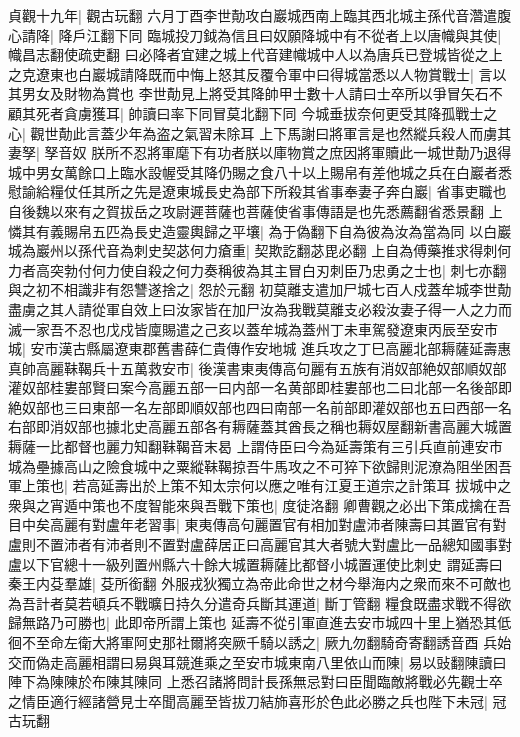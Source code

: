 貞觀十九年|{
	觀古玩翻}
六月丁酉李世勣攻白巖城西南上臨其西北城主孫代音濳遣腹心請降|{
	降戶江翻下同}
臨城投刀鉞為信且曰奴願降城中有不從者上以唐幟與其使|{
	幟昌志翻使疏吏翻}
曰必降者宜建之城上代音建幟城中人以為唐兵已登城皆從之上之克遼東也白巖城請降既而中悔上怒其反覆令軍中曰得城當悉以人物賞戰士|{
	言以其男女及財物為賞也}
李世勣見上將受其降帥甲士數十人請曰士卒所以爭冒矢石不顧其死者貪虜獲耳|{
	帥讀曰率下同冒莫北翻下同}
今城垂拔奈何更受其降孤戰士之心|{
	觀世勣此言蓋少年為盗之氣習未除耳}
上下馬謝曰將軍言是也然縱兵殺人而虜其妻孥|{
	孥音奴}
朕所不忍將軍麾下有功者朕以庫物賞之庶因將軍贖此一城世勣乃退得城中男女萬餘口上臨水設幄受其降仍賜之食八十以上賜帛有差他城之兵在白巖者悉慰諭給糧仗任其所之先是遼東城長史為部下所殺其省事奉妻子奔白巖|{
	省事吏職也自後魏以來有之賀拔岳之攻尉遲菩薩也菩薩使省事傳語是也先悉薦翻省悉景翻}
上憐其有義賜帛五匹為長史造靈輿歸之平壤|{
	為于偽翻下自為彼為汝為當為同}
以白巖城為巖州以孫代音為刺史契苾何力瘡重|{
	契欺訖翻苾毘必翻}
上自為傅藥推求得刺何力者高突勃付何力使自殺之何力奏稱彼為其主冒白刃刺臣乃忠勇之士也|{
	刺七亦翻}
與之初不相識非有怨讐遂捨之|{
	怨於元翻}
初莫離支遣加尸城七百人戍蓋牟城李世勣盡虜之其人請從軍自效上曰汝家皆在加尸汝為我戰莫離支必殺汝妻子得一人之力而滅一家吾不忍也戊戍皆廩賜遣之己亥以蓋牟城為蓋州丁未車駕發遼東丙辰至安市城|{
	安市漢古縣屬遼東郡舊書薛仁貴傳作安地城}
進兵攻之丁巳高麗北部耨薩延壽惠真帥高麗靺鞨兵十五萬救安市|{
	後漢書東夷傳高句麗有五族有消奴部絶奴部順奴部灌奴部桂婁部賢曰案今高麗五部一曰内部一名黄部即桂婁部也二曰北部一名後部即絶奴部也三曰東部一名左部即順奴部也四曰南部一名前部即灌奴部也五曰西部一名右部即消奴部也據北史高麗五部各有耨薩蓋其酋長之稱也耨奴屋翻新書高麗大城置耨薩一比都督也麗力知翻靺鞨音末曷}
上謂侍臣曰今為延壽策有三引兵直前連安市城為壘據高山之險食城中之粟縱靺鞨掠吾牛馬攻之不可猝下欲歸則泥潦為阻坐困吾軍上策也|{
	若高延壽出於上策不知太宗何以應之唯有江夏王道宗之計策耳}
拔城中之衆與之宵遁中策也不度智能來與吾戰下策也|{
	度徒洛翻}
卿曹觀之必出下策成擒在吾目中矣高麗有對盧年老習事|{
	東夷傳高句麗置官有相加對盧沛者陳壽曰其置官有對盧則不置沛者有沛者則不置對盧薛居正曰高麗官其大者號大對盧比一品總知國事對盧以下官總十一級列置州縣六十餘大城置耨薩比都督小城置運使比刺史}
謂延壽曰秦王内芟羣雄|{
	芟所銜翻}
外服戎狄獨立為帝此命世之材今舉海内之衆而來不可敵也為吾計者莫若頓兵不戰曠日持久分遣奇兵斷其運道|{
	斷丁管翻}
糧食既盡求戰不得欲歸無路乃可勝也|{
	此即帝所謂上策也}
延壽不從引軍直進去安市城四十里上猶恐其低徊不至命左衛大將軍阿史那社爾將突厥千騎以誘之|{
	厥九勿翻騎奇寄翻誘音酉}
兵始交而偽走高麗相謂曰易與耳競進乘之至安市城東南八里依山而陳|{
	易以䜴翻陳讀曰陣下為陳陳於布陳其陳同}
上悉召諸將問計長孫無忌對曰臣聞臨敵將戰必先觀士卒之情臣適行經諸營見士卒聞高麗至皆拔刀結斾喜形於色此必勝之兵也陛下未冠|{
	冠古玩翻}
